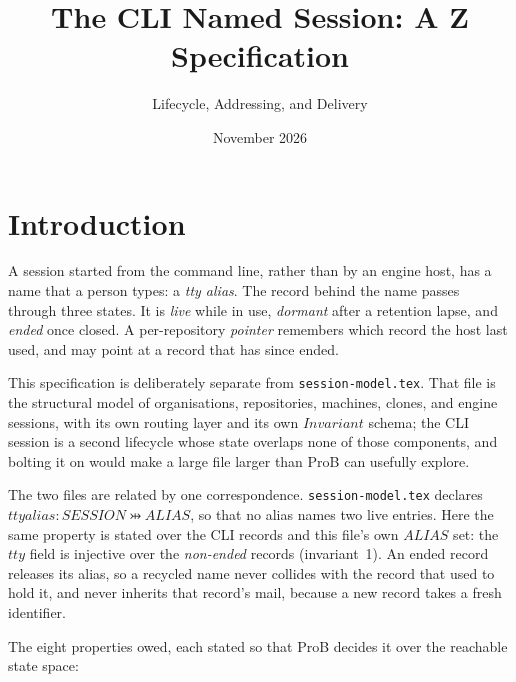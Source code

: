 \documentclass[a4paper,10pt,fleqn]{article}
\begin{document}
\title{The CLI Named Session: A Z Specification}
\author{Lifecycle, Addressing, and Delivery}
\date{November 2026}
\maketitle

\tableofcontents
\newpage

\section{Introduction}

A session started from the command line, rather than by an engine
host, has a name that a person types: a \emph{tty alias}.  The record
behind the name passes through three states.  It is \emph{live} while
in use, \emph{dormant} after a retention lapse, and \emph{ended} once
closed.  A per-repository \emph{pointer} remembers which record the
host last used, and may point at a record that has since ended.

This specification is deliberately separate from
\texttt{session-model.tex}.  That file is the structural model of
organisations, repositories, machines, clones, and engine sessions,
with its own routing layer and its own $Invariant$ schema; the CLI
session is a second lifecycle whose state overlaps none of those
components, and bolting it on would make a large file larger than
ProB can usefully explore.

The two files are related by one correspondence.
\texttt{session-model.tex} declares
$ttyalias : SESSION \pinj ALIAS$, so that no alias names two live
entries.  Here the same property is stated over the CLI records and
this file's own $ALIAS$ set: the $tty$ field is injective over the
\emph{non-ended} records (invariant~1).  An ended record releases its
alias, so a recycled name never collides with the record that used to
hold it, and never inherits that record's mail, because a new record
takes a fresh identifier.

The eight properties owed, each stated so that ProB decides it over the
reachable state space:
\end{document}
